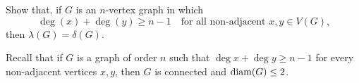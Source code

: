 \question Show that, if $G$ is an $n$-vertex graph in which 
\[
  \deg(x)+\deg(y) \geq n-1 \quad
  \text{for all non-adjacent $x, y \in V(G)$,} 
\]
then $\lambda(G)=\delta(G)$.

\begin{solution}
  Recall that if \(G\) is a graph of order \(n\) such
  that \(\deg x + \deg y \geq n-1\) for every non-adjacent vertices \(x, y\),
  then \(G\) is connected and \(\operatorname{diam}(G) \leq 2\).
  

\end{solution}
